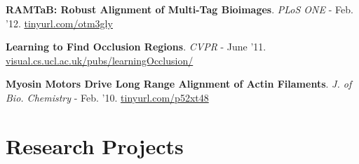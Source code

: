 \documentclass[10pt,twoside,a4paper]{article}
\newif\ifdetail
\newcommand\CPP{C\nolinebreak[4]\hspace{-.05em}\raisebox{.4ex}{\relsize{-3}{\textbf{++}}}}
\begin{document}
{\textbf{RAMTaB: Robust Alignment of Multi-Tag Bioimages}. \ifdetail ($2^{\text{nd}}$ author) \newline \fi \textit{PLoS ONE} - Feb. '12. \href{http://journals.plos.org/plosone/article?id=10.1371/journal.pone.0030894}{\ifdetail journals.plos.org/plosone/article?id=10.1371/journal.pone.0030894 \else tinyurl.com/otm3gly \fi}

\ifdetail
\textbf{A Framework for Molecular Co-Expression Pattern Analysis \newline in Multi-Channel Toponome Fluorescence Images}. ($1^{\text{st}}$ author) \newline \textit{Microscopy Image Analysis with Apps. in Biology (MIAAB)} - Sept. '11. \href{http://ahumayun.com/pubs/humayun_MIAAB_2011_coexpressiontis.pdf}{ahumayun.com/pubs/coexprstis11} %
\fi

\ifdetail
\textbf{Towards Protein Network Analysis Using TIS Imaging and Exploratory Data Analysis}. ($3^{\text{rd}}$ author) \newline \textit{Workshop on Computational Systems Biology (WCSB)} - June '11. \href{http://ahumayun.com/pubs/langenkamper_WCSB_2011_tisdataanalysis.pdf}{ahumayun.com/pubs/tisdata11} %
\fi

\textbf{Learning to Find Occlusion Regions}. \ifdetail ($1^{\text{st}}$ author) \newline \fi \textit{\ifdetail IEEE Conference on Computer Vision and Pattern Recognition (CVPR) \else CVPR \fi} - June '11. \href{http://visual.cs.ucl.ac.uk/pubs/learningOcclusion/}{visual.cs.ucl.ac.uk/pubs/learningOcclusion/}

\textbf{Myosin Motors Drive Long Range Alignment of Actin Filaments}. \ifdetail ($3^{\text{rd}}$ author) \newline \fi \textit{\ifdetail Journal of Biological Chemistry \else J. of Bio. Chemistry \fi} - Feb. '10. \href{http://www.jbc.org/content/285/7/4964.abstract}{\ifdetail www.jbc.org/content/285/7/4964.abstract \else tinyurl.com/p52xt48 \fi}
}


\ifdetail
\clearpage
\newgeometry{top=2.5cm, bottom=2cm, left=1.3cm, right=1.3cm, twoside}
\else
\vspace{-0.4cm}
\fi


\section{Research Projects}
\ifdetail
\textbf{Video Object Detection} at Georgia Institute of Technology (\textit{PhD. thesis}) \newline
Currently researching on combining motion and appearance cues for segmentation and classification of objects in video. The goal is to use video proposals with supervised deep architectures for detection. \underline{Tools}: \textsc{Caffe}, \textsc{Matlab}, \CPP
\fi
\end{document}
